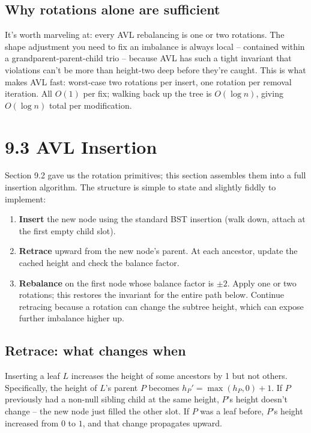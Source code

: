 \documentclass[11pt]{article}
\begin{document}
\subsection*{Why rotations alone are sufficient}

It's worth marveling at: every AVL rebalancing is one or two rotations. The shape adjustment you need to fix an imbalance is always local -- contained within a grandparent-parent-child trio -- because AVL has such a tight invariant that violations can't be more than height-two deep before they're caught. This is what makes AVL fast: worst-case two rotations per insert, one rotation per removal iteration. All $O(1)$ per fix; walking back up the tree is $O(\log n)$, giving $O(\log n)$ total per modification.

\section{9.3 AVL Insertion}

Section 9.2 gave us the rotation primitives; this section assembles them into a full insertion algorithm. The structure is simple to state and slightly fiddly to implement:

\begin{defnbox}
\begin{enumerate}[leftmargin=*]
    \item \textbf{Insert} the new node using the standard BST insertion (walk down, attach at the first empty child slot).
    \item \textbf{Retrace} upward from the new node's parent. At each ancestor, update the cached height and check the balance factor.
    \item \textbf{Rebalance} on the first node whose balance factor is $\pm 2$. Apply one or two rotations; this restores the invariant for the entire path below. Continue retracing because a rotation can change the subtree height, which can expose further imbalance higher up.
\end{enumerate}
\end{defnbox}

\subsection*{Retrace: what changes when}

Inserting a leaf $L$ increases the height of some ancestors by 1 but not others. Specifically, the height of $L$'s parent $P$ becomes $h_P' = \max(h_P, 0) + 1$. If $P$ previously had a non-null sibling child at the same height, $P$'s height doesn't change -- the new node just filled the other slot. If $P$ was a leaf before, $P$'s height increased from $0$ to $1$, and that change propagates upward.
\end{document}
